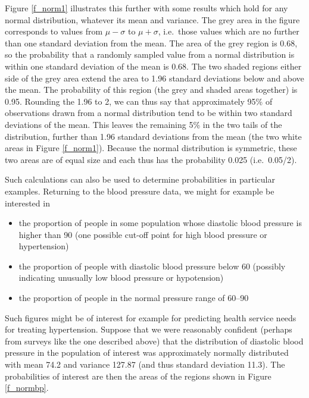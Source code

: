Figure \ref{f_norm1} illustrates this further with some results which hold for
any normal distribution, whatever its mean and variance. The grey area
in the figure corresponds to values from $\mu-\sigma$ to $\mu+\sigma$,
i.e.\ those values which are no further than one standard deviation from
the mean. The area of the grey region is 0.68, so the probability
that a randomly sampled value from a normal distribution is within one
standard deviation of the mean is 0.68. The two shaded regions either
side of the grey area extend the area to 1.96 standard deviations below
and above the mean. The probability of this region (the grey and shaded
areas together) is 0.95. Rounding the 1.96 to 2, we can thus say that
approximately 95\% of observations drawn from a normal distribution tend
to be within two standard deviations of the mean. This leaves the
remaining 5\% in the two tails of the distribution,
further than 1.96 standard deviations from the mean (the two white areas
in Figure \ref{f_norm1}). Because the normal distribution is symmetric,
these two areas are of equal size and each thus has the probability
0.025 (i.e.\ 0.05/2).

Such calculations can also be used to determine probabilities in particular
examples. Returning to the blood pressure data,
we might for example
be interested in

\begin{itemize}
\item
the proportion of people in some population whose diastolic blood
pressure is
higher than 90 (one possible cut-off point for high blood pressure or
hypertension)
\item
the proportion of people with diastolic blood pressure below 60
(possibly indicating unusually low blood pressure or hypotension)
\item
the proportion of people in the normal pressure range of 60--90
\end{itemize}
Such figures might be of interest for example for predicting health
service needs for treating hypertension. Suppose that we were reasonably
confident (perhaps from surveys like the one described above) that the
distribution of diastolic blood pressure in the population of interest
was approximately normally distributed with mean 74.2 and variance
127.87 (and thus standard deviation 11.3). The probabilities of interest
are then the areas of the regions shown in Figure \ref{f_normbp}.


